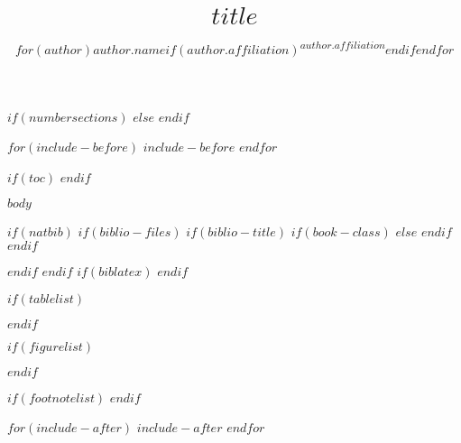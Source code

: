 \documentclass[$if(fontsize)$$fontsize$,$endif$$if(lang)$$lang$,$endif$$if(papersize)$$papersize$,$endif$$if(figsintext)$floatsintext,$endif$$for(class)$$class$$sep$,$endfor$]{apa6}
\title{$title$}
\author{$for(author)$$author.name$$if(author.affiliation)$\textsuperscript{$author.affiliation$}$endif$$endfor$}
\affiliation{
    \vspace{0.5cm}
    $for(affiliation)$
      \textsuperscript{$affiliation.id$} $if(affiliation.institution)$$affiliation.institution$$else$$if(affiliation.city)$$affiliation.city$$endif$$if(affiliation.state)$, $affiliation.state$$endif$$if(affiliation.country)$, $affiliation.country$$endif$$endif$$sep$\\
    $endfor$
  }
\begin{document}
\maketitle

$if(numbersections)$
\setcounter{secnumdepth}{5}
$else$
\setcounter{secnumdepth}{0}
$endif$

$for(include-before)$
  $include-before$
$endfor$

$if(toc)$
  {
  \hypersetup{linkcolor=black}
  \setcounter{tocdepth}{$toc-depth$}
  \tableofcontents
  }
$endif$

$body$

$if(natbib)$
  $if(biblio-files)$
    $if(biblio-title)$
      $if(book-class)$
        \renewcommand\bibname{$biblio-title$}
      $else$
        \renewcommand\refname{$biblio-title$}
      $endif$
    $endif$
  

  $endif$
$endif$
$if(biblatex)$
  \printbibliography
$endif$

$if(tablelist)$
\clearpage
\renewcommand{\listtablename}{Table captions}
\listoftables
$endif$

$if(figurelist)$
\clearpage
\renewcommand{\listfigurename}{Figure captions}
\listoffigures
$endif$

$if(footnotelist)$
\theendnotes
$endif$

$for(include-after)$
  $include-after$
$endfor$
\end{document}
